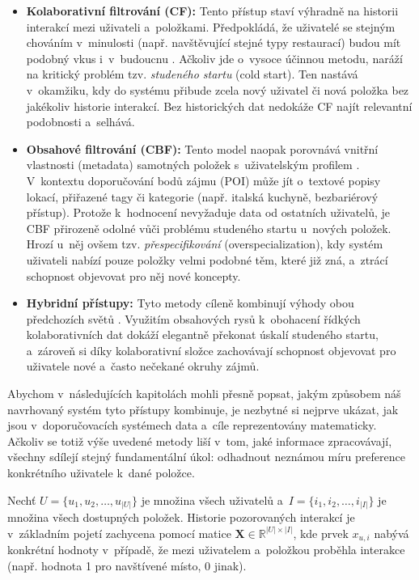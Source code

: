 \begin{itemize}
    \item \textbf{Kolaborativní filtrování (CF):} Tento přístup staví výhradně na historii interakcí mezi uživateli a~položkami. Předpokládá, že uživatelé se stejným chováním v~minulosti (např. navštěvující stejné typy restaurací) budou mít podobný vkus i~v~budoucnu \cite{RicciRokachShapira2022}. Ačkoliv jde o~vysoce účinnou metodu, naráží na kritický problém tzv. \textit{studeného startu} (cold start). Ten nastává v~okamžiku, kdy do systému přibude zcela nový uživatel či nová položka bez jakékoliv historie interakcí. Bez historických dat nedokáže CF najít relevantní podobnosti a~selhává.
    \item \textbf{Obsahové filtrování (CBF):} Tento model naopak porovnává vnitřní vlastnosti (metadata) samotných položek s~uživatelským profilem \cite{Burke2007}. V~kontextu doporučování bodů zájmu (POI) může jít o~textové popisy lokací, přiřazené tagy či kategorie (např. italská kuchyně, bezbariérový přístup). Protože k~hodnocení nevyžaduje data od ostatních uživatelů, je CBF přirozeně odolné vůči problému studeného startu u~nových položek. Hrozí u~něj ovšem tzv. \textit{přespecifikování} (overspecialization), kdy systém uživateli nabízí pouze položky velmi podobné těm, které již zná, a~ztrácí schopnost objevovat pro něj nové koncepty.
    \item \textbf{Hybridní přístupy:} Tyto metody cíleně kombinují výhody obou předchozích světů \cite{Burke2007, RicciRokachShapira2022}. Využitím obsahových rysů k~obohacení řídkých kolaborativních dat dokáží elegantně překonat úskalí studeného startu, a~zároveň si díky kolaborativní složce zachovávají schopnost objevovat pro uživatele nové a~často nečekané okruhy zájmů.
\end{itemize}

Abychom v~následujících kapitolách mohli přesně popsat, jakým způsobem náš navrhovaný systém tyto přístupy kombinuje, je nezbytné si nejprve ukázat, jak jsou v~doporučovacích systémech data a~cíle reprezentovány matematicky. Ačkoliv se totiž výše uvedené metody liší v~tom, jaké informace zpracovávají, všechny sdílejí stejný fundamentální úkol: odhadnout neznámou míru preference konkrétního uživatele k~dané položce. 

Nechť $U = \{u_1, u_2, \dots, u_{|U|}\}$ je množina všech uživatelů a~$I = \{i_1, i_2, \dots, i_{|I|}\}$ je množina všech dostupných položek. Historie pozorovaných interakcí je v~základním pojetí zachycena pomocí matice $\mathbf{X} \in \mathbb{R}^{|U| \times |I|}$, kde prvek $x_{u,i}$ nabývá konkrétní hodnoty v~případě, že mezi uživatelem a~položkou proběhla interakce (např. hodnota 1 pro navštívené místo, 0 jinak). 

